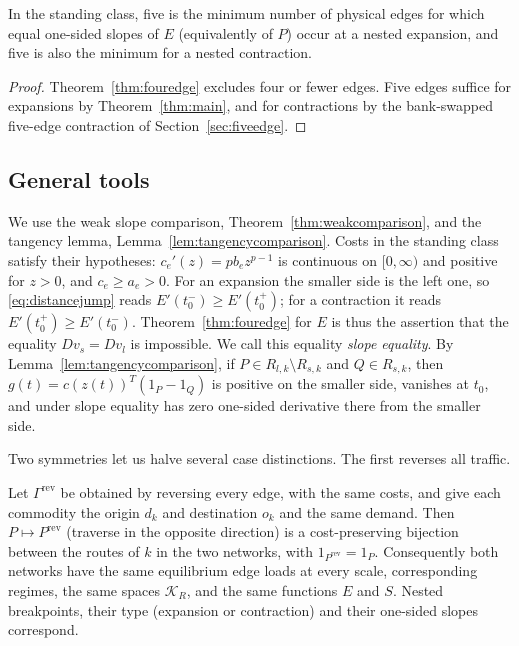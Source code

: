 \begin{corollary}\label{cor:fiveminimal}
In the standing class, five is the minimum number of physical edges for
which equal one-sided slopes of $E$ (equivalently of $P$) occur at a nested
expansion, and five is also the minimum for a nested contraction.
\end{corollary}

\begin{proof}
Theorem~\ref{thm:fouredge} excludes four or fewer edges. Five edges suffice
for expansions by Theorem~\ref{thm:main}, and for contractions by the
bank-swapped five-edge contraction of Section~\ref{sec:fiveedge}.
\end{proof}

\subsection{General tools}

We use the weak slope comparison, Theorem~\ref{thm:weakcomparison}, and the tangency lemma, Lemma~\ref{lem:tangencycomparison}. Costs in the standing class satisfy their hypotheses: $c_e'(z)=pb_ez^{p-1}$ is continuous on $[0,\infty)$ and positive for $z>0$, and $c_e\ge a_e>0$. For an expansion the smaller side is the left one, so \eqref{eq:distancejump} reads $E'(t_0^-)\ge E'(t_0^+)$; for a contraction it reads $E'(t_0^+)\ge E'(t_0^-)$. Theorem~\ref{thm:fouredge} for $E$ is thus the assertion that the equality $Dv_s=Dv_l$ is impossible. We call this equality \emph{slope equality}. By Lemma~\ref{lem:tangencycomparison}, if $P\in R_{l,k}\setminus R_{s,k}$ and $Q\in R_{s,k}$, then $g(t)=c(z(t))^T(1_P-1_Q)$ is positive on the smaller side, vanishes at $t_0$, and under slope equality has zero one-sided derivative there from the smaller side.

Two symmetries let us halve several case distinctions. The first reverses
all traffic.

\begin{lemma}\label{lem:reversal}
Let $\Gamma^{\mathrm{rev}}$ be obtained by reversing every edge, with the same
costs, and give each commodity the origin $d_k$ and destination $o_k$ and the
same demand. Then $P\mapsto P^{\mathrm{rev}}$ (traverse in the opposite
direction) is a cost-preserving bijection between the routes of $k$ in the
two networks, with $1_{P^{\mathrm{rev}}}=1_P$. Consequently both networks
have the same equilibrium edge loads at every scale, corresponding regimes,
the same spaces $\mathcal K_R$, and the same functions $E$ and $S$. Nested
breakpoints, their type (expansion or contraction) and their one-sided
slopes correspond.
\end{lemma}

